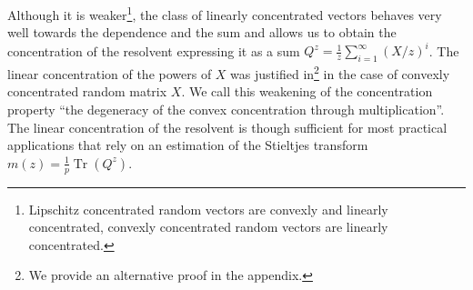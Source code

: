 \documentclass{ws-rmta}
\DeclareMathOperator{\tr}{Tr}
\begin{document}

Although it is weaker\footnote{Lipschitz concentrated random vectors are convexly and linearly concentrated, convexly concentrated random vectors are linearly concentrated.}, the class of linearly concentrated vectors behaves very well towards the dependence and the sum and allows us to obtain the concentration of the resolvent expressing it as a sum $Q^z = \frac{1}{z}\sum_{i=1}^\infty (X/z)^i$. The linear concentration of the powers of $X$ was justified in\footnote{We provide an alternative proof in the appendix.} \cite{MEC11} in the case of convexly concentrated random matrix $X$. We call this weakening of the concentration property ``the degeneracy of the convex concentration through multiplication''. The linear concentration of the resolvent is though sufficient for most practical applications that rely on an estimation of the Stieltjes transform $m(z) = \frac{1}{p} \tr(Q^z)$.%
\end{document}
